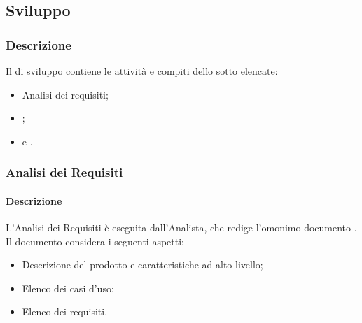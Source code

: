 \subsection{Sviluppo}\label{sviluppo}

\subsubsection{Descrizione}
Il  di sviluppo contiene le attività e compiti dello  sotto elencate:
\begin{itemize}
  \item Analisi dei requisiti;
  \item {};
  \item {} e .
\end{itemize}


\subsubsection{Analisi dei Requisiti}\label{analisi-requisiti}
\paragraph{Descrizione}
L'Analisi dei Requisiti è eseguita dall'Analista, che redige l'omonimo documento \AdR. Il documento considera i seguenti aspetti:
\begin{itemize}
  \item Descrizione del prodotto e caratteristiche ad alto livello;
  \item Elenco dei casi d'uso;
  \item Elenco dei requisiti.
\end{itemize}

